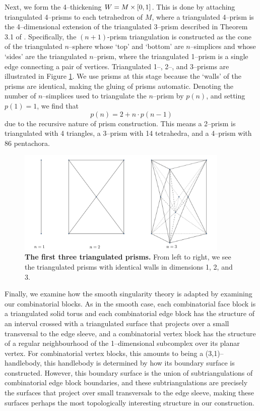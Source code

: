 Next, we form the 4--thickening $W=M\times[0,1]$.
This is done by attaching triangulated 4--prisms to each tetrahedron of $M$, where a triangulated 4--prism is the 4--dimensional extension of the triangulated 3--prism described in Theorem 3.1 of \cite{burton2011simplification}.
Specifically, the $(n+1)$-prism triangulation is constructed as the cone of the triangulated $n$--sphere whose `top' and `bottom' are $n$--simplices and whose `sides' are the triangulated $n$--prism, where the triangulated 1--prism is a single edge connecting a pair of vertices.
Triangulated 1--, 2--, and 3--prisms are illustrated in Figure \ref{fig:prisms}.
We use prisms at this stage because the `walls' of the prisms are identical, making the gluing of prisms automatic.
Denoting the number of $n$--simplices used to triangulate the $n$--prism by $p(n)$, and setting $p(1)=1$, we find that
\[
	p(n) = 2 + n\cdot p(n-1)
\]
due to the recursive nature of prism construction.
This means a 2--prism is triangulated with 4 triangles, a 3--prism with 14 tetrahedra, and a 4--prism with 86 pentachora.

\begin{figure}[h!]
	\centering
	\includegraphics[width=0.9\textwidth]{figures/prisms.png}
	\caption{
		\textbf{The first three triangulated prisms.}
		From left to right, we see the triangulated prisms with identical walls in dimensions 1, 2, and 3.
	}
	\label{fig:prisms}
\end{figure}

Finally, we examine how the smooth singularity theory is adapted by examining our combinatorial blocks.
As in the smooth case, each combinatorial face block is a triangulated solid torus and each combinatorial edge block has the structure of an interval crossed with a triangulated surface that projects over a small transversal to the edge sleeve, and a combinatorial vertex block has the structure of a regular neighbourhood of the 1--dimensional subcomplex over its planar vertex.
For combinatorial vertex blocks, this amounts to being a (3,1)--handlebody, this handlebody is determined by how its boundary surface is constructed.
However, this boundary surface is the union of subtriangulations of combinatorial edge block boundaries, and these subtriangulations are precisely the surfaces that project over small transversals to the edge sleeve, making these surfaces perhaps the most topologically interesting structure in our construction.


